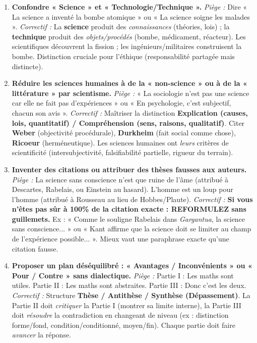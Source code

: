 \documentclass[11pt]{article}
\begin{document}
\begin{attention}
    \begin{enumerate}
        \item \textbf{Confondre « Science » et « Technologie/Technique ».}
        \textit{Piège :} Dire « La science a inventé la bombe atomique » ou « La science soigne les malades ».
        \textit{Correctif :} La \textbf{science} produit des \emph{connaissances} (théories, lois) ; la \textbf{technique} produit des \emph{objets/procédés} (bombe, médicament, réacteur). Les scientifiques découvrent la fission ; les ingénieurs/militaires construisent la bombe. Distinction cruciale pour l'éthique (responsabilité partagée mais distincte).
        \item \textbf{Réduire les sciences humaines à de la « non-science » ou à de la « littérature » par scientisme.}
        \textit{Piège :} « La sociologie n'est pas une science car elle ne fait pas d'expériences » ou « En psychologie, c'est subjectif, chacun son avis ».
        \textit{Correctif :} Maîtriser la distinction \textbf{Explication (causes, lois, quantitatif) / Compréhension (sens, raisons, qualitatif)}. Citer \textbf{Weber} (objectivité procédurale), \textbf{Durkheim} (fait social comme chose), \textbf{Ricoeur} (herméneutique). Les sciences humaines ont \emph{leurs} critères de scientificité (intersubjectivité, falsifiabilité partielle, rigueur du terrain).
        \item \textbf{Inventer des citations ou attribuer des thèses fausses aux auteurs.}
        \textit{Piège :} \guillemotleft La science sans conscience n'est que ruine de l'âme \guillemotright (attribué à Descartes, Rabelais, ou Einstein au hasard). \guillemotleft L'homme est un loup pour l'homme \guillemotright (attribué à Rousseau au lieu de Hobbes/Plaute).
        \textit{Correctif :} \textbf{Si vous n'êtes pas sûr à 100\% de la citation exacte : REFORMULEZ sans guillemets.} Ex : « Comme le souligne Rabelais dans \emph{Gargantua}, la science sans conscience... » ou « Kant affirme que la science doit se limiter au champ de l'expérience possible... ». Mieux vaut une paraphrase exacte qu'une citation fausse.
        \item \textbf{Proposer un plan déséquilibré : « Avantages / Inconvénients » ou « Pour / Contre » sans dialectique.}
        \textit{Piège :} Partie I : Les maths sont utiles. Partie II : Les maths sont abstraites. Partie III : Donc c'est les deux.
        \textit{Correctif :} Structure \textbf{Thèse / Antithèse / Synthèse (Dépassement)}. La Partie II doit \emph{critiquer} la Partie I (montrer sa limite interne), la Partie III doit \emph{résoudre} la contradiction en changeant de niveau (ex : distinction forme/fond, condition/conditionné, moyen/fin). Chaque partie doit faire \emph{avancer} la réponse.

\end{enumerate}
\end{attention}
\end{document}
